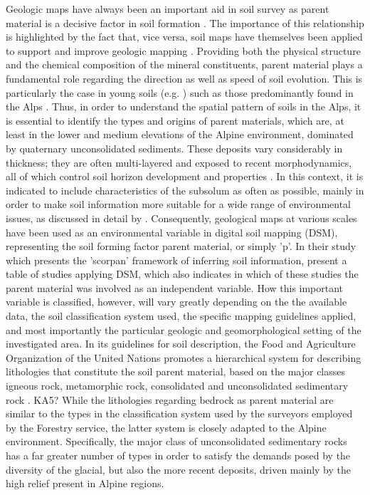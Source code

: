 \documentclass[preprint,12pt,authoryear]{elsarticle}
\begin{document}
Geologic maps have always been an important aid in soil survey as parent material is a decisive factor in soil formation \citep{Jenny1941}. The importance of this relationship is highlighted by the fact that, vice versa, soil maps have themselves been applied to support and improve geologic mapping \citep{Brevik2015}. Providing both the physical structure and the chemical composition of the mineral constituents, parent material plays a fundamental role regarding the direction as well as speed of soil evolution.  This is particularly the case in young soils (e.g. \cite{Schaetzl2000}) such as those predominantly found in the Alps \citep{Geitner2017}. Thus, in order to understand the spatial pattern of soils in the Alps, it is essential to identify the types and origins of parent materials, which are, at least in the lower and medium elevations of the Alpine environment, dominated by quaternary unconsolidated sediments. These deposits vary considerably in thickness; they are often multi-layered and exposed to recent morphodynamics, all of which control soil horizon development and properties \citep{Phillips2008}. In this context, it is indicated to include characteristics of the subsolum as often as possible, mainly in order to make soil information more suitable for a wide range of environmental issues, as discussed in detail by \cite{Juilleret2016}. Consequently, geological maps at various scales have been used as an environmental variable in digital soil mapping (DSM), representing the soil forming factor parent material, or simply 'p'. In their study  which presents the 'scorpan' framework of inferring soil information, \cite{McBratney2003} present a table of studies applying DSM, which also indicates in which of these studies the parent material was involved as an independent variable. How this important variable is classified, however, will vary greatly depending on the the available data, the soil classification system used, the specific mapping guidelines applied, and most importantly the particular geologic and geomorphological setting of the investigated area. In its guidelines for soil description, the Food and Agriculture Organization of the United Nations promotes a hierarchical system for describing lithologies that constitute the soil parent material, based on the major classes igneous rock, metamorphic rock, consolidated and unconsolidated sedimentary rock \citep{FAO2006}. KA5? While the lithologies regarding bedrock as parent material are similar to the types in the classification system used by the surveyors employed by the Forestry service, the latter system is closely adapted to the Alpine environment. Specifically, the major class of unconsolidated sedimentary rocks has a far greater number of types in order to satisfy the demands posed by the diversity of the glacial, but also the more recent deposits, driven mainly by the high relief present in Alpine regions.
\end{document}
